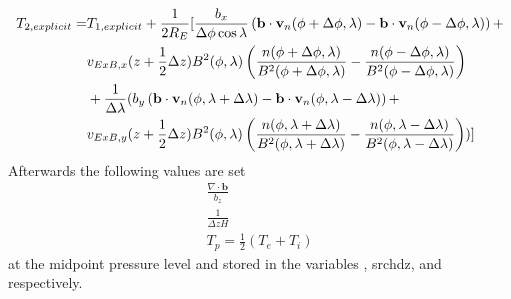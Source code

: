 \begin{align}
 T_{2,explicit} = & T_{1,explicit} + \frac{1}{2 R_E}[
   \frac{b_x}{\Delta \phi \cos \lambda} \left( \mathbf{b} \cdot \mathbf{v}_n
   (\phi+\Delta \phi,\lambda) -\mathbf{b} \cdot \mathbf{v}_n
   (\phi-\Delta \phi,\lambda) \right) + \notag \\
   {}& v_{ExB,x}(z+\frac{1}{2}\Delta z) B^2(\phi,\lambda) \left(
   \frac{n(\phi+\Delta \phi,\lambda)}{B^2(\phi+\Delta \phi,\lambda)} -
   \frac{n(\phi-\Delta \phi,\lambda)}{B^2(\phi-\Delta
   \phi,\lambda)}\right) \notag \\
   {}& +\frac{1}{\Delta \lambda}( b_y \left( \mathbf{b} \cdot \mathbf{v}_n
   (\phi,\lambda+ \Delta \lambda) -\mathbf{b} \cdot \mathbf{v}_n
   (\phi,\lambda- \Delta \lambda) \right) + \notag \\
   {}& v_{ExB,y}(z+\frac{1}{2}\Delta z) B^2(\phi,\lambda) \left(
   \frac{n(\phi,\lambda+ \Delta \lambda)}{B^2(\phi,\lambda+ \Delta \lambda)} -
   \frac{n(\phi,\lambda- \Delta \lambda)}{B^2(\phi,\lambda- \Delta \lambda)}\right)
   )
   ]
   \label{eq:oplus_exp2}
\end{align}
%
Afterwards the following values are set
%
\begin{align}
 \frac{\nabla \cdot \mathbf{b}}{b_z} \\
 \frac{1}{\Delta z H} \\
 T_p = \frac{1}{2}(T_e + T_i)
\end{align}
%
at the midpoint pressure level and stored in the variables
, src{hdz}, and  respectively. \\

